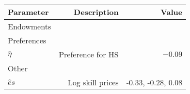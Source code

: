 \begin{tabular}{lrr}
\hline
Parameter & Description  & Value  \\
\hline
Endowments &   &   \\
Preferences &   &   \\
$\bar{\eta}$ & Preference for HS  & $-0.09$  \\
Other &   &   \\
$\hat{e}{s}$ & Log skill prices  & -0.33, -0.28, 0.08  \\
\hline
\end{tabular}%
